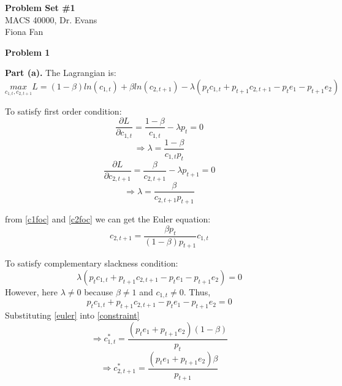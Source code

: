 \documentclass[letterpaper,12pt]{article}
\theoremstyle{definition}
\begin{document}
\begin{flushleft}
  \textbf{\large{Problem Set \#1}} \\
  MACS 40000, Dr. Evans \\
  Fiona Fan 
\end{flushleft}

\vspace{5mm}

\noindent\textbf{Problem 1}

\textbf{Part (a).} The Lagrangian is:
\begin{equation*}
	\underset{c_{1,t}, c_{2,t+1}}{max}
  L= (1-\beta)ln(c_{1,t})+\beta ln(c_{2,t+1})-\lambda (p_t c_{1,t}+p_{t+1} c_{2,t+1}-p_t e_1-p_{t+1} e_2)
\end{equation*}

To satisfy first order condition:
\begin{equation*} 
\frac{\partial L}{\partial c_{1,t}} = \frac{1-\beta}{c_{1,t}}-\lambda p_t = 0
\end{equation*}
\begin{equation} \label{c1foc}
\Rightarrow \lambda = \frac{1-\beta}{c_{1,t}  p_t}
\end{equation}
\begin{equation*} 
\frac{\partial L}{\partial c_{2,t+1}} = \frac{\beta}{c_{2,t+1}}-\lambda p_{t+1} = 0
\end{equation*}
\begin{equation} \label{c2foc}
\Rightarrow \lambda = \frac{\beta}{c_{2,t+1} p_{t+1}}
\end{equation}

from \eqref{c1foc} and \eqref{c2foc} we can get the Euler equation:
\begin{equation} \label{euler}
c_{2,t+1}=\frac{\beta p_t}{(1-\beta) p_{t+1}} c_{1,t}
\end{equation}

To satisfy complementary slackness condition:
\begin{equation*}
\lambda (p_t c_{1,t}+p_{t+1} c_{2,t+1}-p_t e_1-p_{t+1} e_2) = 0
\end {equation*}
However, here $\lambda \neq 0$ because $\beta \neq 1$ and $c_{1,t} \neq 0$. Thus,
\begin{equation} \label{constraint}
p_t c_{1,t}+p_{t+1} c_{2,t+1}-p_t e_1-p_{t+1} e_2 = 0
\end {equation}
Substituting \eqref{euler} into \eqref{constraint}
\begin{equation} \label{c1a}
\Rightarrow c_{1,t}^*=\frac{(p_t e_1+p_{t+1} e_2)(1-\beta)}{p_t}
\end {equation}
\begin{equation} \label{c2a}
\Rightarrow c_{2,t+1}^*=\frac{(p_t e_1+p_{t+1} e_2) \beta}{p_{t+1}}
\end {equation}
\end{document}

